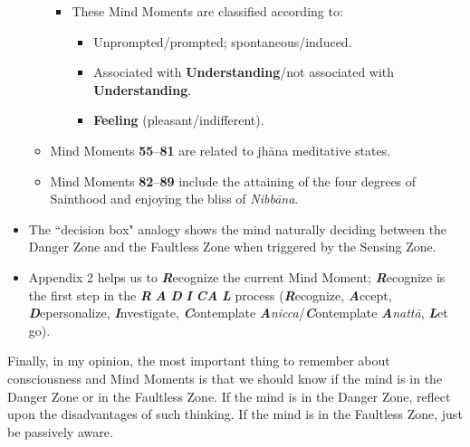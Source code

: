 \begin{itemize}
\begin{itemize}
\begin{itemize}

\item These Mind Moments are classified according to:

\begin{itemize}

\item Unprompted/prompted; spontaneous/induced.

\item Associated with \textbf{Understanding}/not associated with \textbf{Understanding}.

\item \textbf{Feeling} (pleasant/indifferent).

\end{itemize}

\end{itemize}

\item Mind Moments \textbf{55}--\textbf{81} are related to jhāna meditative states.

\item Mind Moments \textbf{82}--\textbf{89} include the attaining of the four degrees of Sainthood and enjoying the bliss of \textit{Nibbāna}.

\end{itemize}

\item The ``decision box" analogy shows the mind naturally deciding between the Danger Zone and the Faultless Zone when triggered by the Sensing Zone.

\item Appendix 2 helps us to \textbf{\textit{R}}ecognize the current Mind Moment; \textbf{\textit{R}}ecognize is the first step in the \textbf{\textit{R}} \textbf{\textit{A}} \textbf{\textit{D}} \textbf{\textit{I}} \textbf{\textit{CA}} \textbf{\textit{L}} process (\textbf{\textit{R}}ecognize, \textbf{\textit{A}}ccept, \textbf{\textit{D}}epersonalize, \textbf{\textit{I}}nvestigate, \textbf{\textit{C}}ontemplate \textbf{\textit{A}}\textit{nicca}/\textbf{\textit{C}}ontemplate \textbf{\textit{A}}\textit{nattā}, \textbf{\textit{L}}et go).

\end{itemize}

Finally, in my opinion, the most important thing to remember about consciousness and Mind Moments is that we should know if the mind is in the Danger Zone or in the Faultless Zone. If the mind is in the Danger Zone, reflect upon the disadvantages of such thinking. If the mind is in the Faultless Zone, just be passively aware.


